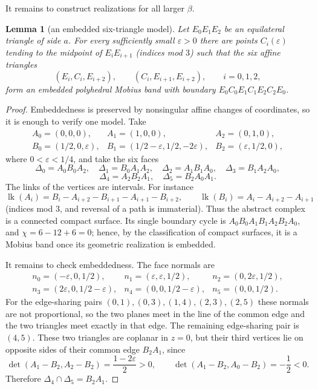 \documentclass[12pt]{article}
\newtheorem{lemma}{Lemma}
\begin{document}
It remains to construct realizations for all larger \(\beta\).

\begin{lemma}[an embedded six-triangle model]\label{lem:model}
Let \(E_0E_1E_2\) be an equilateral triangle of side \(a\).  For every
sufficiently small \(\varepsilon>0\) there are points \(C_i(\varepsilon)\)
tending to the midpoint of \(E_iE_{i+1}\) (indices mod \(3\)) such that
the six affine triangles
\[
(E_i,C_i,E_{i+2}),\qquad (C_i,E_{i+1},E_{i+2}),\qquad i=0,1,2,
\]
form an embedded polyhedral Mobius band with boundary
\(E_0C_0E_1C_1E_2C_2E_0\).
\end{lemma}

\begin{proof}
Embeddedness is preserved by nonsingular affine changes of coordinates,
so it is enough to verify one model.  Take
\[
\begin{array}{lll}
A_0=(0,0,0),& A_1=(1,0,0),& A_2=(0,1,0),\\
B_0=(1/2,0,\varepsilon),&
B_1=(1/2-\varepsilon,1/2,-2\varepsilon),&
B_2=(\varepsilon,1/2,0),
\end{array}
\]
where \(0<\varepsilon<1/4\), and take the six faces
\[
\Delta_0=A_0B_0A_2,\quad \Delta_1=B_0A_1A_2,\quad
\Delta_2=A_1B_1A_0,\quad \Delta_3=B_1A_2A_0,
\]
\[
\Delta_4=A_2B_2A_1,\quad \Delta_5=B_2A_0A_1 .
\]
The links of the vertices are intervals.  For instance
\[
 \operatorname{lk}(A_i)=
 B_i-A_{i+2}-B_{i+1}-A_{i+1}-B_{i+2},\qquad
 \operatorname{lk}(B_i)=A_i-A_{i+2}-A_{i+1}
\]
(indices mod \(3\), and reversal of a path is immaterial).  Thus the
abstract complex is a connected compact surface.  Its single boundary
cycle is \(A_0B_0A_1B_1A_2B_2A_0\), and
\(\chi=6-12+6=0\); hence, by the classification of compact surfaces, it
is a Mobius band once its geometric realization is embedded.

It remains to check embeddedness.  The face normals are
\[
\begin{array}{lll}
n_0=(-\varepsilon,0,1/2),&
n_1=(\varepsilon,\varepsilon,1/2),&
n_2=(0,2\varepsilon,1/2),\\
n_3=(2\varepsilon,0,1/2-\varepsilon),&
n_4=(0,0,1/2-\varepsilon),&
n_5=(0,0,1/2).
\end{array}
\]
For the edge-sharing pairs
\((0,1),(0,3),(1,4),(2,3),(2,5)\) these normals are not proportional, so
the two planes meet in the line of the common edge and the two triangles
meet exactly in that edge.  The remaining edge-sharing pair is
\((4,5)\).  These two triangles are coplanar in \(z=0\), but their third
vertices lie on opposite sides of their common edge \(B_2A_1\), since
\[
 \det(A_1-B_2,A_2-B_2)=\frac{1-2\varepsilon}{2}>0,\qquad
 \det(A_1-B_2,A_0-B_2)=-\frac{1}{2}<0 .
\]
Therefore \(\Delta_4\cap\Delta_5=B_2A_1\).


\end{proof}
\end{document}
